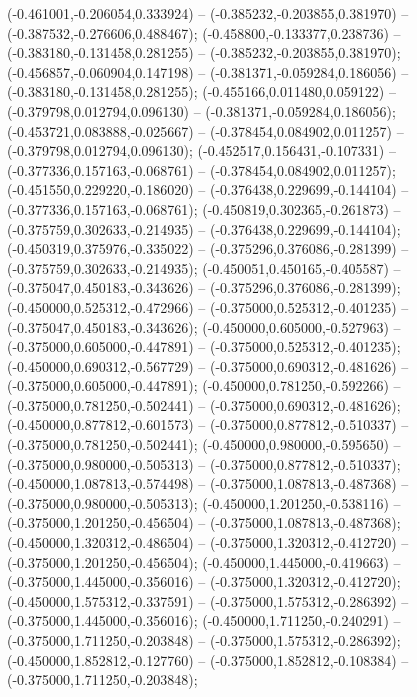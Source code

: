  (-0.461001,-0.206054,0.333924) -- (-0.385232,-0.203855,0.381970) -- (-0.387532,-0.276606,0.488467);
 (-0.458800,-0.133377,0.238736) -- (-0.383180,-0.131458,0.281255) -- (-0.385232,-0.203855,0.381970);
 (-0.456857,-0.060904,0.147198) -- (-0.381371,-0.059284,0.186056) -- (-0.383180,-0.131458,0.281255);
 (-0.455166,0.011480,0.059122) -- (-0.379798,0.012794,0.096130) -- (-0.381371,-0.059284,0.186056);
 (-0.453721,0.083888,-0.025667) -- (-0.378454,0.084902,0.011257) -- (-0.379798,0.012794,0.096130);
 (-0.452517,0.156431,-0.107331) -- (-0.377336,0.157163,-0.068761) -- (-0.378454,0.084902,0.011257);
 (-0.451550,0.229220,-0.186020) -- (-0.376438,0.229699,-0.144104) -- (-0.377336,0.157163,-0.068761);
 (-0.450819,0.302365,-0.261873) -- (-0.375759,0.302633,-0.214935) -- (-0.376438,0.229699,-0.144104);
 (-0.450319,0.375976,-0.335022) -- (-0.375296,0.376086,-0.281399) -- (-0.375759,0.302633,-0.214935);
 (-0.450051,0.450165,-0.405587) -- (-0.375047,0.450183,-0.343626) -- (-0.375296,0.376086,-0.281399);
 (-0.450000,0.525312,-0.472966) -- (-0.375000,0.525312,-0.401235) -- (-0.375047,0.450183,-0.343626);
 (-0.450000,0.605000,-0.527963) -- (-0.375000,0.605000,-0.447891) -- (-0.375000,0.525312,-0.401235);
 (-0.450000,0.690312,-0.567729) -- (-0.375000,0.690312,-0.481626) -- (-0.375000,0.605000,-0.447891);
 (-0.450000,0.781250,-0.592266) -- (-0.375000,0.781250,-0.502441) -- (-0.375000,0.690312,-0.481626);
 (-0.450000,0.877812,-0.601573) -- (-0.375000,0.877812,-0.510337) -- (-0.375000,0.781250,-0.502441);
 (-0.450000,0.980000,-0.595650) -- (-0.375000,0.980000,-0.505313) -- (-0.375000,0.877812,-0.510337);
 (-0.450000,1.087813,-0.574498) -- (-0.375000,1.087813,-0.487368) -- (-0.375000,0.980000,-0.505313);
 (-0.450000,1.201250,-0.538116) -- (-0.375000,1.201250,-0.456504) -- (-0.375000,1.087813,-0.487368);
 (-0.450000,1.320312,-0.486504) -- (-0.375000,1.320312,-0.412720) -- (-0.375000,1.201250,-0.456504);
 (-0.450000,1.445000,-0.419663) -- (-0.375000,1.445000,-0.356016) -- (-0.375000,1.320312,-0.412720);
 (-0.450000,1.575312,-0.337591) -- (-0.375000,1.575312,-0.286392) -- (-0.375000,1.445000,-0.356016);
 (-0.450000,1.711250,-0.240291) -- (-0.375000,1.711250,-0.203848) -- (-0.375000,1.575312,-0.286392);
 (-0.450000,1.852812,-0.127760) -- (-0.375000,1.852812,-0.108384) -- (-0.375000,1.711250,-0.203848);

